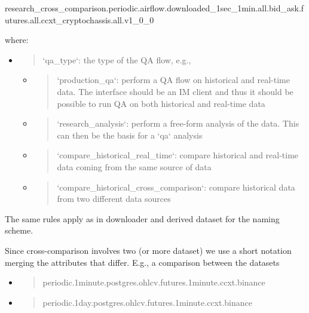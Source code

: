 \documentclass[11pt, reqno]{amsart}
\begin{document}
research\_cross\_comparison.periodic.airflow.downloaded\_1sec\_1min.all.bid\_ask.futures.all.ccxt\_cryptochassis.all.v1\_0\_0

where:

\begin{itemize}
\item
  \begin{quote}
  `qa\_type`: the type of the QA flow, e.g.,
  \end{quote}

  \begin{itemize}
  \item
    \begin{quote}
    `production\_qa`: perform a QA flow on historical and real-time
    data. The interface should be an IM client and thus it should be
    possible to run QA on both historical and real-time data
    \end{quote}
  \item
    \begin{quote}
    `research\_analysis`: perform a free-form analysis of the data. This
    can then be the basis for a `qa` analysis
    \end{quote}
  \item
    \begin{quote}
    `compare\_historical\_real\_time`: compare historical and real-time
    data coming from the same source of data
    \end{quote}
  \item
    \begin{quote}
    `compare\_historical\_cross\_comparison`: compare historical data
    from two different data sources
    \end{quote}
  \end{itemize}
\end{itemize}

The same rules apply as in downloader and derived dataset for the naming
scheme.

Since cross-comparison involves two (or more dataset) we use a short
notation merging the attributes that differ. E.g., a comparison between
the datasets

\begin{itemize}
\item
  \begin{quote}
  periodic.1minute.postgres.ohlcv.futures.1minute.ccxt.binance
  \end{quote}
\item
  \begin{quote}
  periodic.1day.postgres.ohlcv.futures.1minute.ccxt.binance
  \end{quote}
\end{itemize}
\end{document}
